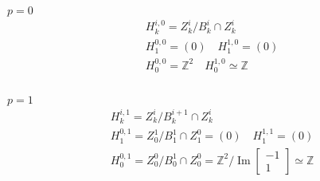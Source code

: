 \documentclass[11pt,a4paper]{report}
\DeclareMathOperator{\Ima}{Im}
\begin{document}
              \\
              \underline{$p = 0$}
              \begin{align*}
                &H_k^{i,0} = Z_k^i / B_k^i \cap Z_k^i\\
                &H_1^{0,0} = (0) \quad H_1^{1,0} = (0)\\
                &H_0^{0,0} = \mathbb{Z}^2 \quad H_0^{1,0} \simeq \mathbb{Z}\\
              \end{align*}
              \\
              \underline{$p = 1$}
              \begin{align*}
                &H_k^{i,1} = Z_k^i / B_k^{i+1} \cap Z_k^i\\
                &H_1^{0,1} = Z_0^1 / B_1^{1} \cap Z_1^0 = (0) \quad H_1^{1,1} = (0)\\
                &H_0^{0,1} = Z_0^0 / B_0^{1} \cap Z_0^0 = \mathbb{Z}^2 / \Ima \begin{bmatrix}-1\\1\end{bmatrix} \simeq \mathbb{Z}\\
              \end{align*}
              \\
\end{document}
